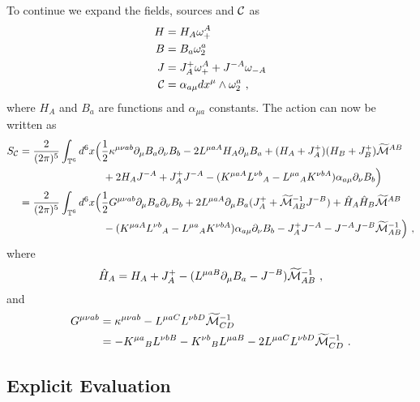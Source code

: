 \documentclass[11pt]{article}
\numberwithin{equation}{section}
\begin{document}
To continue we expand the fields, sources and ${\cal C}$ as
\begin{align}
H & = H_A\omega^A_+\nonumber\\
B &  = B_a\omega^a_2\nonumber\\
 J & = J^+_{A}\omega^A_+ + J^{-A}\omega_{-A}\nonumber\\
{\cal C} &  = \alpha_{a\mu  } dx^\mu \wedge \omega^a_2\ ,	
\end{align}
where $H_A$ and  $B_a$ are functions and $\alpha_{\mu a}$ constants. The action can now be written as
\begin{align}\label{action6D}
S_{\cal C}&= \frac{2}{(2\pi)^5}\int_{{\mathbb T}^6} d^6x\Big( \frac12 \kappa^{\mu\nu ab}\partial_\mu B_a\partial_\nu B_b -2L^{\mu a A}  H_A \partial_\mu B_a+  (H_A+J^+_{A})(H_B+J^+_{B})\widetilde{\cal M}^{AB}\nonumber\\ 
&\qquad\qquad\qquad\qquad +2H_A J^{-A}  +J^+_{A}J^{-A}  -(K^{\mu a A}L^{\nu b}{}_A-L^{\mu a}{}_AK^{\nu b A})\alpha_{a\mu }\partial_\nu B_b\Big)\nonumber\\
& = \frac{2}{(2\pi)^5} \int_{{\mathbb T}^6} d^6x \Big(\frac12 G^{\mu\nu ab}\partial_\mu B_a\partial_\nu B_b +2L^{\mu a A}\partial_\mu B_a(J^+_{A}+\widetilde{\cal M}^{-1}_{AB}J^{-B})+  \hat H_A\hat H_B\widetilde{\cal M}^{AB}\nonumber\\
	&\qquad\qquad\qquad\qquad -(K^{\mu a A}L^{\nu b}{}_A-L^{\mu a}{}_AK^{\nu b A})\alpha_{a\mu  }\partial_\nu B_b -J^+_{A}J^{-A} -J^{-A}J^{-B}\widetilde{\cal M}^{-1}_{AB}
 \Big)\ ,
\end{align}
where
\begin{align}
\hat H_A = H_A + J^+_{A} - (L^{\mu a B}\partial_\mu B_a-J^{-B})\widetilde{\cal M}^{-1}_{AB}\ ,
\end{align}
and\begin{align}
G^{\mu\nu ab} &= \kappa^{\mu\nu ab} - L^{\mu a C}L^{\nu b D}\widetilde{\cal M}^{-1}_{CD}	\nonumber\\
&=-K^{\mu a}{}_BL^{\nu b B}{}-K^{\nu b}{}_BL^{\mu a B}{}  - 2L^{\mu a C}L^{\nu b D}\widetilde{\cal M}^{-1}_{CD}\ .
\end{align} 

\subsection{Explicit Evaluation}
\end{document}
